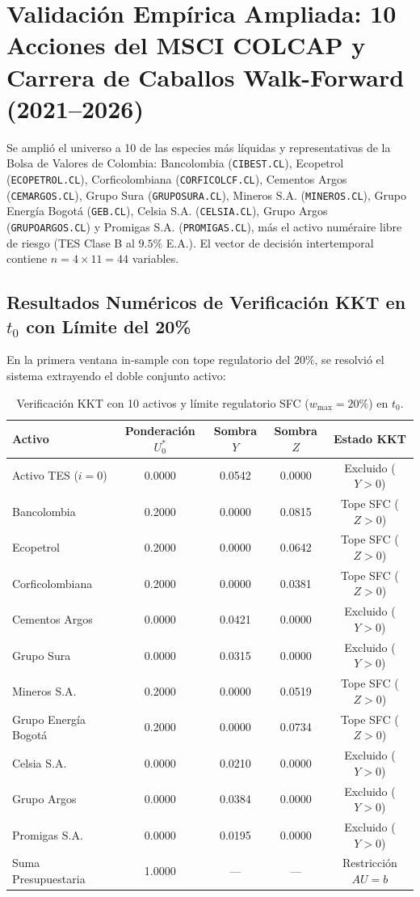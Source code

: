 \documentclass[11pt,a4paper]{article}
\begin{document}
\section{Validación Empírica Ampliada: 10 Acciones del MSCI COLCAP y Carrera de Caballos Walk-Forward (2021--2026)}

Se amplió el universo a 10 de las especies más líquidas y representativas de la Bolsa de Valores de Colombia: Bancolombia (\texttt{CIBEST.CL}), Ecopetrol (\texttt{ECOPETROL.CL}), Corficolombiana (\texttt{CORFICOLCF.CL}), Cementos Argos (\texttt{CEMARGOS.CL}), Grupo Sura (\texttt{GRUPOSURA.CL}), Mineros S.A. (\texttt{MINEROS.CL}), Grupo Energía Bogotá (\texttt{GEB.CL}), Celsia S.A. (\texttt{CELSIA.CL}), Grupo Argos (\texttt{GRUPOARGOS.CL}) y Promigas S.A. (\texttt{PROMIGAS.CL}), más el activo numéraire libre de riesgo (TES Clase B al $9.5\%$ E.A.). El vector de decisión intertemporal contiene $n = 4 \times 11 = 44$ variables.

\subsection{Resultados Numéricos de Verificación KKT en \texorpdfstring{$t_0$}{t0} con Límite del 20\%}
En la primera ventana in-sample con tope regulatorio del $20\%$, se resolvió el sistema extrayendo el doble conjunto activo:

\begin{table}[htbp]
\centering
\footnotesize
\setlength{\tabcolsep}{5pt}
\begin{tabular}{lcccc}
\toprule
Activo & Ponderación $U_0^*$ & Sombra $Y$ & Sombra $Z$ & Estado KKT \\
\midrule
Activo TES ($i=0$) & 0.0000 & 0.0542 & 0.0000 & Excluido ($Y > 0$) \\
Bancolombia & 0.2000 & 0.0000 & 0.0815 & Tope SFC ($Z > 0$) \\
Ecopetrol & 0.2000 & 0.0000 & 0.0642 & Tope SFC ($Z > 0$) \\
Corficolombiana & 0.2000 & 0.0000 & 0.0381 & Tope SFC ($Z > 0$) \\
Cementos Argos & 0.0000 & 0.0421 & 0.0000 & Excluido ($Y > 0$) \\
Grupo Sura & 0.0000 & 0.0315 & 0.0000 & Excluido ($Y > 0$) \\
Mineros S.A. & 0.2000 & 0.0000 & 0.0519 & Tope SFC ($Z > 0$) \\
Grupo Energía Bogotá & 0.2000 & 0.0000 & 0.0734 & Tope SFC ($Z > 0$) \\
Celsia S.A. & 0.0000 & 0.0210 & 0.0000 & Excluido ($Y > 0$) \\
Grupo Argos & 0.0000 & 0.0384 & 0.0000 & Excluido ($Y > 0$) \\
Promigas S.A. & 0.0000 & 0.0195 & 0.0000 & Excluido ($Y > 0$) \\
\midrule
Suma Presupuestaria & 1.0000 & --- & --- & Restricción $AU=b$ \\
\bottomrule
\end{tabular}
\caption{Verificación KKT con 10 activos y límite regulatorio SFC ($w_{\max} = 20\%$) en $t_0$.}
\end{table}
\end{document}
